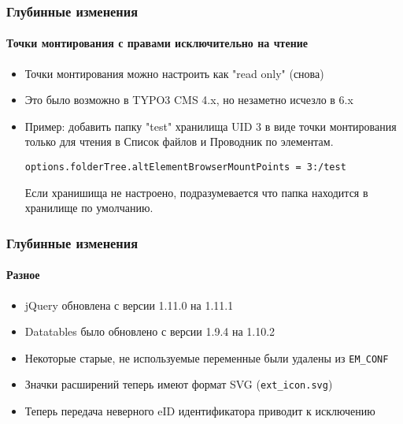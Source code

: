 
\begin{frame}[fragile]
	\frametitle{Глубинные изменения}
	\framesubtitle{Точки монтирования с правами исключительно на чтение}

	\begin{itemize}

		\item Точки монтирования можно настроить как "read only" (снова)
		\item Это было возможно в TYPO3 CMS 4.x, но незаметно исчезло в 6.x
		\item Пример: добавить папку "test" хранилища UID 3 в виде точки монтирования только для чтения в Список файлов и
		Проводник по элементам.\newline

			\smaller\texttt{options.folderTree.altElementBrowserMountPoints = 3:/test}\normalsize\newline

			Если хранишища не настроено, подразумевается что папка находится в хранилище по умолчанию.
	\end{itemize}

\end{frame}


\begin{frame}[fragile]
	\frametitle{Глубинные изменения}
	\framesubtitle{Разное}

	\begin{itemize}
		\item jQuery обновлена с версии 1.11.0 на 1.11.1
		\item Datatables было обновлено с версии 1.9.4 на 1.10.2
		\item Некоторые старые, не используемые переменные были удалены из \texttt{EM\_CONF}
		\item Значки расширений теперь имеют формат SVG (\texttt{ext\_icon.svg})
		\item Теперь передача неверного eID идентификатора приводит к исключению
	\end{itemize}

\end{frame}

